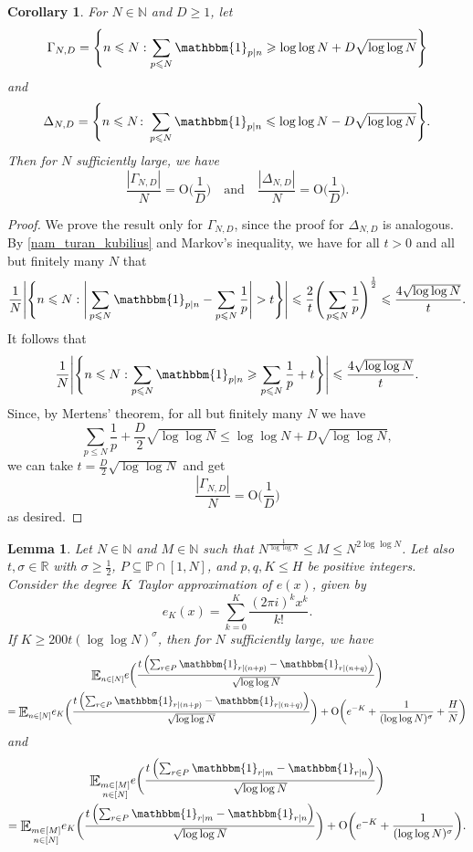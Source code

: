 \documentclass[letter,11pt]{article}
\theoremstyle{plain} %
\newtheorem{lemma}[theorem]{Lemma}
\newtheorem{corollary}[theorem]{Corollary}
\theoremstyle{definition} %
\theoremstyle{plain}
\theoremstyle{plain}
\theoremstyle{plain}
\numberwithin{equation}{section}
\newcommand{\Oh}{{\mathrm O}}
\newcommand{\N}{\mathbb{N}}
\newcommand{\R}{\mathbb{R}}
\renewcommand{\leq}{\leqslant}
\renewcommand{\geq}{\geqslant}
\renewcommand{\P}{\mathbb{P}}
\renewcommand{\subset}{\subseteq}
\newcommand{\Esub}[1]{\raisebox{-0.4ex}{\scalebox{1.4}[1.3]{$\mathbb{E}$}}\raisebox{-0.35ex}{\ensuremath{_{\scriptstyle #1}}}}
\newcommand{\1}{\mathbbm{1}}
\begin{document}
\begin{corollary}
\label{cor_TK_1}
For $N\in\N$ and $D\geq 1$, let $$\Gamma_{N,D}=\Bigg\{n\leq N: \sum_{p\leq N}\1_{p\mid n}\geq \log\log N+ D\sqrt{\log\log{N}}\Bigg\}$$ and $$\Delta_{N,D} = \Bigg\{n\leq N\colon \sum_{p\leq N}\1_{p\mid n} \leq \log\log N - D\sqrt{\log\log{N}}\Bigg\}.$$
Then for $N$ sufficiently large, we have
$$\frac{|\Gamma_{N,D}|}{N} =\Oh\bigg(\frac{1}{D}\bigg) \quad\text{and}\quad
\frac{|\Delta_{N,D}|}{N} =\Oh\bigg(\frac{1}{D}\bigg).$$
\end{corollary}

\begin{proof}
We prove the result only for $\Gamma_{N,D}$, since the proof for $\Delta_{N,D}$ is analogous.
By \cref{nam_turan_kubilius} and Markov's inequality, we have for all $t>0$ and all but finitely many $N$ that
\[
\frac{1}{N}\Bigg|\Bigg\{n\leq N: \Bigg|\sum_{p\leq N}\1_{p\mid n}-\sum_{p\leq N}\frac{1}{p}\Bigg| >t \Bigg\}\Bigg|
\leq \frac{2}{t} \Bigg(\sum_{p\leq N}\frac{1}{p}\Bigg)^{\frac{1}{2}}
\leq \frac{4\sqrt{\log\log{N}}}{t}.
\]
It follows that
\[
\frac{1}{N}\Bigg|\Bigg\{n\leq N: \sum_{p\leq N}\1_{p\mid n} \geq \sum_{p\leq N}\frac{1}{p} + t \Bigg\}\Bigg|\leq  \frac{4\sqrt{\log\log{N}}}{t}.
\]
Since, by Mertens' theorem, for all but finitely many $N$ we have
\[
\sum_{p\leq N}\frac{1}{p} + \frac{D}{2}\sqrt{\log\log{N}}\leq \log\log N+ D\sqrt{\log\log{N}},
\]
we can take $t=\frac{D}{2}\sqrt{\log\log{N}}$ and get
\[
\frac{|\Gamma_{N,D}|}{N} =\Oh\bigg(\frac{1}{D}\bigg)
\]
as desired.
\end{proof}

\begin{lemma}
\label{lem_approx_deg_K}
Let $N\in\N$ and $M\in\N$ such that $N^\frac{1}{\log\log{N}}\leq M\leq N^{2\log\log{N}}$. Let also $t,\sigma\in\R$ with $\sigma\geq \frac{1}{2}$, $P\subset \P\cap [1,N]$, and $p,q,K\leq H$ be positive integers. Consider the degree $K$ Taylor approximation of $e(x)$, given by
\[
e_K(x)=\sum_{k=0}^K \frac{(2\pi i)^k x^k}{k!}.
\]
If $K\geq 200 t (\log\log N)^\sigma$, then for $N$ sufficiently large, we have
\begin{multline}
\label{eqn_approx_deg_K_1}
\Esub{n\in[N]} e\bigg(\frac{t\left(\sum_{r\in P}\1_{r\mid (n+p)}-\1_{r\mid (n+q)}\right)}{\sqrt{\log\log{N}}}\bigg)
\\
=\Esub{n\in[N]}e_K\bigg(\frac{t\left(\sum_{r\in P}\1_{r\mid (n+p)}-\1_{r\mid (n+q)}\right)}{\sqrt{\log\log{N}}}\bigg) + \Oh\bigg(e^{-K}+\frac{1}{(\log\log N)^\sigma}+\frac{H}{N}\bigg)
\end{multline}
and
\begin{multline}
\label{eqn_approx_deg_K_2}
\Esub{\substack{m\in[M] \\ n\in[N]}}e\bigg(\frac{t\left(\sum_{r\in P}\1_{r\mid m}-\1_{r\mid n}\right)}{\sqrt{\log\log{N}}}\bigg)
\\
=\Esub{\substack{m\in[M] \\ n\in[N]}}e_K\bigg(\frac{t\left(\sum_{r\in P}\1_{r\mid m}-\1_{r\mid n}\right)}{\sqrt{\log\log{N}}}\bigg) + \Oh\bigg(e^{-K}+\frac{1}{(\log\log N)^\sigma}\bigg).
\end{multline}
\end{lemma}
\end{document}
